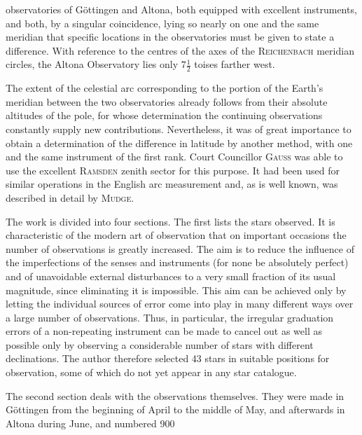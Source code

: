 \par\clearpage
\noindent{}\makebox[12mm][r]{}\par\medskip

\noindent observatories of Göttingen and Altona, both equipped with excellent
instruments, and both, by a singular coincidence, lying so nearly on one and
the same meridian that specific locations in the observatories must be given
to state a difference. With reference to the centres of the axes of the
\textsc{Reichenbach} meridian circles, the Altona Observatory lies only
\(7\tfrac12\) toises farther west.

The extent of the celestial arc corresponding to the portion of the Earth's
meridian between the two observatories already follows from their absolute
altitudes of the pole, for whose determination the continuing observations
constantly supply new contributions. Nevertheless, it was of great importance
to obtain a determination of the difference in latitude by another method,
with one and the same instrument of the first rank. Court Councillor \textsc{Gauss}
was able to use the excellent \textsc{Ramsden} zenith sector for this purpose.
It had been used for similar operations in the English arc measurement and,
as is well known, was described in detail by \textsc{Mudge}.

The work is divided into four sections. The first lists the stars observed.
It is characteristic of the modern art of observation that on important
occasions the number of observations is greatly increased. The aim is to
reduce the influence of the imperfections of the senses and instruments
(for none  be absolutely perfect) and of unavoidable external
disturbances to a very small fraction of its usual magnitude, since eliminating
it is impossible. This aim can be achieved only by letting the individual
sources of error come into play in many different ways over a large number of
observations. Thus, in particular, the irregular graduation errors of a
non-repeating instrument can be made to cancel out as well as possible only
by observing a considerable number of stars with different declinations.
The author therefore selected 43 stars in suitable positions for observation,
some of which do not yet appear in any star catalogue.

The second section deals with the observations themselves. They were made
in Göttingen from the beginning of April to the middle of May, and afterwards
in Altona during June, and numbered 900
\par

